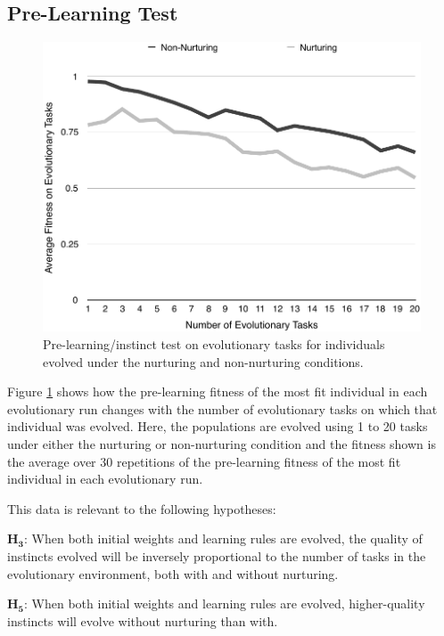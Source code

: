 \documentclass[master]{outhesis}
\begin{document}
\subsection{Pre-Learning Test}

\begin{figure}[h]
	\centering
	\includegraphics{NetworkTestPlot.pdf}
	\caption{Pre-learning/instinct test on evolutionary tasks for individuals evolved under the nurturing and non-nurturing conditions.}
	\label{fig:PreLearningTest}
\end{figure}

Figure \ref{fig:PreLearningTest} shows how the pre-learning fitness of the most fit individual in each evolutionary run changes with the number of evolutionary tasks on which that individual was evolved.
Here,
the populations are evolved using 1 to 20 tasks under either the nurturing or non-nurturing condition
and the fitness shown is the average over 30 repetitions of the pre-learning fitness of the most fit individual in each evolutionary run.

This data is relevant to the following hypotheses:

$\mathbf{H_3}$: When both initial weights and learning rules are evolved, the quality of instincts evolved will be inversely proportional to the number of tasks in the evolutionary environment, both with and without nurturing.

$\mathbf{H_5}$: When both initial weights and learning rules are evolved, higher-quality instincts will evolve without nurturing than with.
\end{document}
